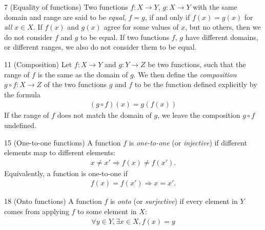 \begin{definition}{7}
    \label{function-equality}
    (Equality of functions) Two functions $f: X\rightarrow Y$, $g: X\rightarrow Y$ with the same domain and range are
    said to be \emph{equal}, $f=g$, if and only if $f(x)=g(x)$ for \emph{all} $x\in X$. If $f(x)$ and $g(x)$ agree for
    some values of $x$, but no others, then we do not consider $f$ and $g$ to be equal. If two functions $f$, $g$ have
    different domains, or different ranges, we also do not consider them to be equal.
\end{definition}

\begin{definition}{11}
    \label{function-composition}
    (Composition) Let $f: X\rightarrow Y$ and $g: Y\rightarrow Z$ be two functions, such that the range of $f$ is the
    same as the domain of $g$. We then define the \emph{composition} $g\circ f: X\rightarrow Z$ of the two functions
    $g$ and $f$ to be the function defined explicitly by the formula
    \begin{align*}
        (g\circ f)(x) = g(f(x))
    \end{align*}
    If the range of $f$ does not match the domain of $g$, we leave the composition $g\circ f$ undefined.
\end{definition}

\begin{definition}{15}
    \label{injective}
    (One-to-one functions) A function $f$ is \emph{one-to-one} (or \emph{injective}) if different elements map to
    different elements:
    \begin{align*}
        x\neq x' \Rightarrow f(x)\neq f(x').
    \end{align*}
    Equivalently, a function is one-to-one if
    \begin{align*}
        f(x)=f(x') \Rightarrow x=x'.
    \end{align*}
\end{definition}

\begin{definition}{18}
    \label{surjective}
    (Onto functions) A function $f$ is \emph{onto} (or \emph{surjective}) if every element in $Y$ comes from applying
    $f$ to some element in $X$:
    \begin{align*}
        \forall y\in Y, \exists x\in X, f(x)=y
    \end{align*}
\end{definition}

